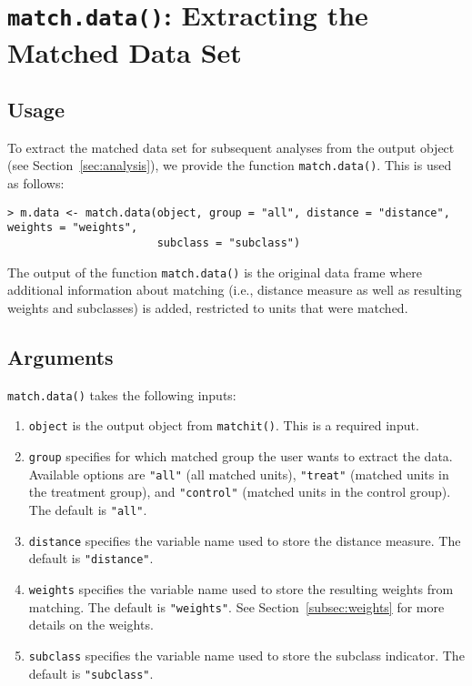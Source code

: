 \section{\texttt{match.data()}: Extracting the Matched Data Set}
\label{sec:match.data}

\subsection{Usage}

To extract the matched data set for subsequent analyses from the
output object (see Section~\ref{sec:analysis}), we provide the
function {\tt match.data()}.  This is used as follows:

\begin{verbatim}
> m.data <- match.data(object, group = "all", distance = "distance", weights = "weights", 
                       subclass = "subclass")
\end{verbatim}

The output of the function {\tt match.data()} is the original data
frame where additional information about matching (i.e., distance
measure as well as resulting weights and subclasses) is added,
restricted to units that were matched.

\subsection{Arguments}

{\tt match.data()} takes the following inputs:
\begin{enumerate}
\item {\tt object} is the output object from {\tt matchit()}. This is
  a required input.
\item {\tt group} specifies for which matched group the user wants to
  extract the data. Available options are {\tt "all"} (all matched
  units), {\tt "treat"} (matched units in the treatment group), and
  {\tt "control"} (matched units in the control group). The default is
  {\tt "all"}.
\item {\tt distance} specifies the variable name used to store the
  distance measure. The default is {\tt "distance"}.
\item {\tt weights} specifies the variable name used to store the
  resulting weights from matching. The default is {\tt "weights"}. See
  Section~\ref{subsec:weights} for more details on the weights.
\item {\tt subclass} specifies the variable name used to store the
  subclass indicator. The default is {\tt "subclass"}.
\end{enumerate}

